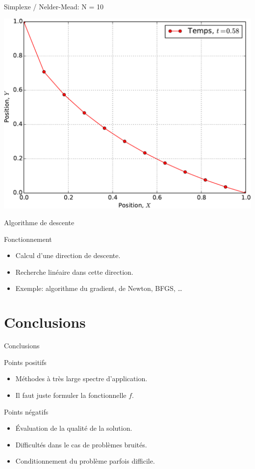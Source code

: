 \documentclass[8pt,a4paper]{beamer}
\begin{document}
\begin{frame}{Simplexe / Nelder-Mead: N = 10}
  
  \begin{center}
  \includegraphics[width = .9\textwidth]{figures/brachi_NM_20D.pdf}
  \end{center}
\end{frame}

\begin{frame}{Algorithme de descente}
  
  \begin{block}{Fonctionnement}
  \begin{itemize}
  \item Calcul d'une direction de descente.
  \item Recherche linéaire dans cette direction.
  \item Exemple: algorithme du gradient, de Newton, BFGS, \ldots
  \end{itemize}
  \end{block}
 
\end{frame}

\section{Conclusions}
\begin{frame}{Conclusions}
  \begin{block}{Points positifs}
   \begin{itemize}
  \item Méthodes à très large spectre d'application.
  \item Il faut juste formuler la fonctionnelle $f$.
  \end{itemize}
  \end{block}
 \begin{alertblock}{Points négatifs}
   \begin{itemize}
  \item Évaluation de la qualité de la solution.
  \item Difficultés dans le cas de problèmes bruités.
  \item Conditionnement du problème parfois difficile.
  \end{itemize}
  \end{alertblock}
   
\end{frame}
\end{document}
